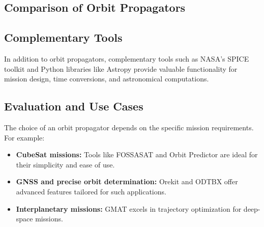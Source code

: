 % 

\subsection{Comparison of Orbit Propagators}

\subsection{Complementary Tools}
In addition to orbit propagators, complementary tools such as NASA's SPICE toolkit and Python libraries like Astropy provide valuable functionality for mission design, time conversions, and astronomical computations.

\subsection{Evaluation and Use Cases}
The choice of an orbit propagator depends on the specific mission requirements. For example:
\begin{itemize}
    \item \textbf{CubeSat missions:} Tools like FOSSASAT and Orbit Predictor are ideal for their simplicity and ease of use.
    \item \textbf{GNSS and precise orbit determination:} Orekit and ODTBX offer advanced features tailored for such applications.
    \item \textbf{Interplanetary missions:} GMAT excels in trajectory optimization for deep-space missions.
\end{itemize}

\endinput  %
